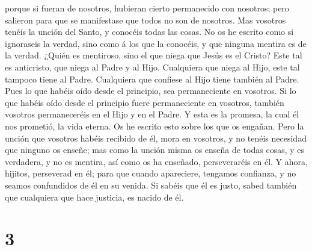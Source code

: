 porque si fueran de nosotros, hubieran cierto permanecido con nosotros;
pero salieron para que se manifestase que todos no son de nosotros.
 Mas vosotros tenéis la unción del Santo, y conocéis todas
las cosas.  No os he escrito como si ignoraseis la verdad,
sino como á los que la conocéis, y que ninguna mentira es de la verdad.
 ¿Quién es mentiroso, sino el que niega que Jesús es el
Cristo? Este tal es anticristo, que niega al Padre y al Hijo.
 Cualquiera que niega al Hijo, este tal tampoco tiene al
Padre. Cualquiera que confiese al Hijo tiene también al Padre.
 Pues lo que habéis oído desde el principio, sea
permaneciente en vosotros. Si lo que habéis oído desde el principio
fuere permaneciente en vosotros, también vosotros permaneceréis en el
Hijo y en el Padre.  Y esta es la promesa, la cual él nos
prometió, la vida eterna.  Os he escrito esto sobre los que
os engañan.  Pero la unción que vosotros habéis recibido de
él, mora en vosotros, y no tenéis necesidad que ninguno os enseñe; mas
como la unción misma os enseña de todas cosas, y es verdadera, y no es
mentira, así como os ha enseñado, perseveraréis en él.  Y
ahora, hijitos, perseverad en él; para que cuando apareciere, tengamos
confianza, y no seamos confundidos de él en su venida.  Si
sabéis que él es justo, sabed también que cualquiera que hace justicia,
es nacido de él.

\hypertarget{section-2}{%
\section{3}\label{section-2}}


